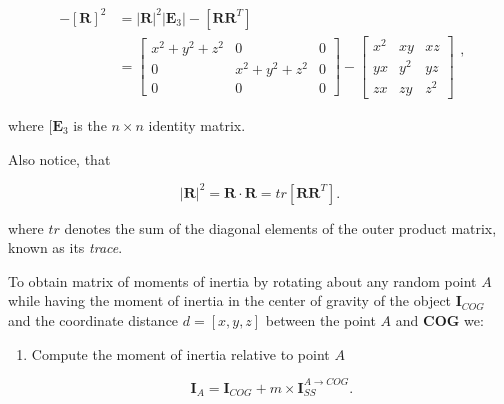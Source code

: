 \documentclass[10pt,b5paper,titlepage]{book}
\begin{document}
\begin{itemize}
        \begin{equation}
            \begin{array}{ll}
                 \\
                -[\mathbf{R}]^{2}
                &= |\mathbf{R}|^{2}|\mathbf{E}_{3}| - [\mathbf{R}\mathbf{R}^{T}] \\
                &= \begin{bmatrix}
                    x^{2} + y^{2} + z^{2} & 0 & 0 \\
                    0 & x^{2} + y^{2} + z^{2} & 0 \\
                    0 & 0 & 0
                \end{bmatrix} - \begin{bmatrix}
                    x^{2} & xy & xz \\
                    yx & y^{2} & yz \\
                    zx & zy & z^{2}
                \end{bmatrix}
            \end{array}
        ,\end{equation}

        where $[\mathbf{E}_{3}$ is the $n \times n$  identity matrix.

        Also notice, that

        \begin{equation}
            |\mathbf{R}|^{2} = \mathbf{R} \cdot \mathbf{R} = tr [\mathbf{R}\mathbf{R}^{T}]
        .\end{equation}

        where $tr$ denotes the sum of the diagonal elements of the outer product
        matrix, known as its \textit{trace}.

        To obtain matrix of moments of inertia by rotating about any random
        point $A$ while having the moment of inertia in the center of gravity of
        the object $\mathbf{I}_{COG}$ and the coordinate distance $d = [x, y, z]$
        between the point $A$ and \textbf{COG} we:

        \begin{enumerate}
            \item Compute the moment of inertia relative to point $A$

                 \begin{equation}
                    \mathbf{I}_{A} = \mathbf{I}_{COG} + m \times \mathbf{I}_{SS}^{A \to COG}
                .\end{equation}


\end{enumerate}
\end{itemize}
\end{document}
